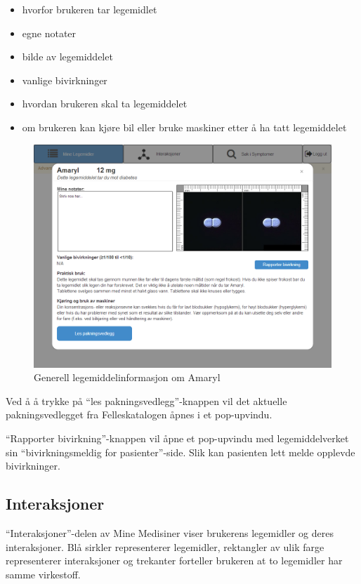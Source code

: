 \begin{itemize}
\item hvorfor brukeren tar legemidlet
\item egne notater
\item bilde av legemiddelet
\item vanlige bivirkninger
\item hvordan brukeren skal ta legemiddelet
\item om brukeren kan kjøre bil eller bruke maskiner etter å ha tatt legemiddelet
\end{itemize}

\begin{figure}[H]
    \centering
    \includegraphics[width=1\textwidth]{fig/utviklingAvPrototype/amaryl.PNG}
    \caption{Generell legemiddelinformasjon om Amaryl}
    \label{fig:amaryl}
\end{figure} 

Ved å å trykke på “les pakningsvedlegg”-knappen vil det aktuelle pakningsvedlegget fra Felleskatalogen åpnes i et pop-upvindu. 

“Rapporter bivirkning”-knappen vil åpne et pop-upvindu med legemiddelverket sin “bivirkningsmeldig for pasienter”-side. Slik kan pasienten lett melde opplevde bivirkninger.

\subsection{Interaksjoner} \label{subchap:interaksjoner}
“Interaksjoner”-delen av Mine Medisiner viser brukerens legemidler og deres interaksjoner. Blå sirkler representerer legemidler, rektangler av ulik farge representerer interaksjoner og trekanter forteller brukeren at to legemidler har samme virkestoff. 

